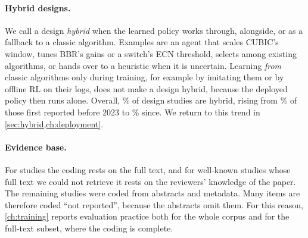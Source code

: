 \paragraph{Hybrid designs.} We call a design \emph{hybrid} when the learned policy works through, alongside, or as a fallback to a classic algorithm. Examples are an agent that scales CUBIC's window, tunes BBR's gains or a switch's ECN threshold, selects among existing algorithms, or hands over to a heuristic when it is uncertain. Learning \emph{from} classic algorithms only during training, for example by imitating them or by offline RL on their logs, does not make a design hybrid, because the deployed policy then runs alone. Overall, \nPctHybrid\% of design studies are hybrid, rising from \nPctHybridPre\% of those first reported before 2023 to \nPctHybridPost\% since. We return to this trend in \cref{sec:hybrid,ch:deployment}.

\paragraph{Evidence base.} For \nSrcFT{} studies the coding rests on the full text, and for \nSrcKN{} well-known studies whose full text we could not retrieve it rests on the reviewers' knowledge of the paper. The remaining \nSrcAB{} studies were coded from abstracts and metadata. Many items are therefore coded ``not reported'', because the abstracts omit them. For this reason, \cref{ch:training} reports evaluation practice both for the whole corpus and for the full-text subset, where the coding is complete.
